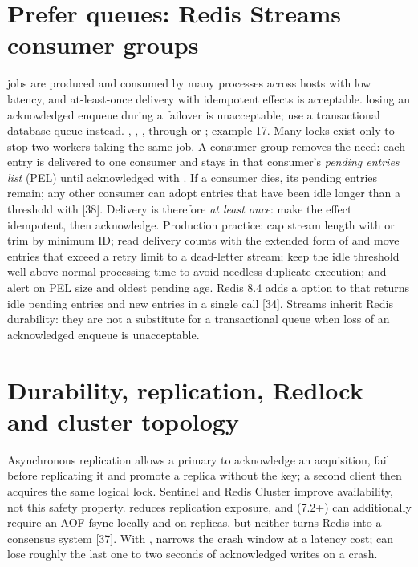 \section{Prefer queues: Redis Streams consumer groups}\label{sec:streams}
{jobs are produced and consumed by many processes across hosts with low latency, and at-least-once delivery with idempotent effects is acceptable.}
{losing an acknowledged enqueue during a failover is unacceptable; use a transactional database queue instead.}
{, , ,  through  or ; example 17.}
Many locks exist only to stop two workers taking the same job. A consumer group removes the need: each entry is delivered to one consumer and stays in that consumer's \emph{pending entries list} (PEL) until acknowledged with . If a consumer dies, its pending entries remain; any other consumer can adopt entries that have been idle longer than a threshold with  [38]. Delivery is therefore \emph{at least once}: make the effect idempotent, then acknowledge.
Production practice: cap stream length with  or trim by minimum ID; read delivery counts with the extended form of  and move entries that exceed a retry limit to a dead-letter stream; keep the idle threshold well above normal processing time to avoid needless duplicate execution; and alert on PEL size and oldest pending age. Redis 8.4 adds a  option to  that returns idle pending entries and new entries in a single call [34]. Streams inherit Redis durability: they are not a substitute for a transactional queue when loss of an acknowledged enqueue is unacceptable.

\section{Durability, replication, Redlock and cluster topology}
Asynchronous replication allows a primary to acknowledge an acquisition, fail before replicating it and promote a replica without the key; a second client then acquires the same logical lock. Sentinel and Redis Cluster improve availability, not this safety property.  reduces replication exposure, and  (7.2+) can additionally require an AOF fsync locally and on replicas, but neither turns Redis into a consensus system [37]. With ,  narrows the crash window at a latency cost;  can lose roughly the last one to two seconds of acknowledged writes on a crash.

